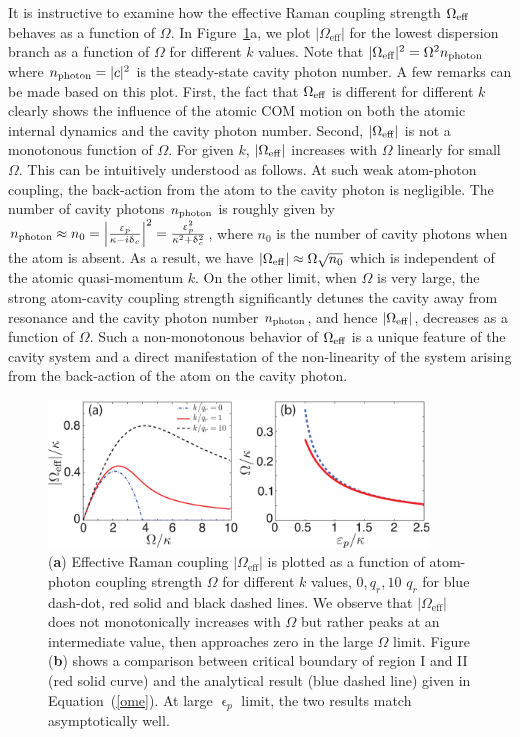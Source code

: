 \documentclass[atoms,article,accept,moreauthors,pdftex,12pt,a4paper]{mdpi}
\begin{document}
It is instructive to examine how the effective Raman coupling strength $\Omega_{\rm eff}$ behaves as a function of $\Omega$. In Figure~\ref{fig2}a, we plot $|\Omega_\text{eff}|$ for the lowest dispersion branch as a function of $\Omega$ for different $k$ values. Note that $|\Omega_{\rm eff}|^2 = \Omega^2 n_{\rm photon}$ where $n_{\rm photon}=|c|^2$ is the steady-state cavity photon number. A few remarks can be made based on this plot. First, the fact that $\Omega_{\rm eff}$ is different for different $k$ clearly shows the influence of the atomic COM motion on both the atomic internal dynamics and the cavity photon number. Second, $|\Omega_{\rm eff}|$ is not a monotonous function of $\Omega$. For given $k$, $|\Omega_{\rm eff}|$ increases with $\Omega$ linearly for small $\Omega$. This can be intuitively understood as follows. At such weak atom-photon coupling, the back-action from the atom to the cavity photon is negligible. The number of cavity photons $n_{\rm photon}$ is roughly given by $n_{\rm photon} \approx n_0=\left|\frac{\upvarepsilon_{p}}{\kappa-i\updelta_{c}}\right|^2= \frac{\upvarepsilon_p^2}{\kappa^2+ \updelta_c^2}$, where $n_0$ is the number of cavity photons when the atom is absent. As a result, we have $|\Omega_{\rm eff}| \approx \Omega \sqrt{n_0}$ which is independent of the atomic quasi-momentum $k$. On the other limit, when $\Omega$ is very large, the strong atom-cavity coupling strength significantly detunes the cavity away from resonance and the cavity photon number $n_{\rm photon}$, and hence $|\Omega_{\rm eff}|$, decreases as a function of $\Omega$. Such a non-monotonous behavior of $\Omega_{\rm eff}$ is a unique feature of the cavity system and a direct manifestation of the non-linearity of the system arising from the back-action of the atom on the cavity photon.


\begin{figure}[H]
\centering
\includegraphics[width=0.9\textwidth]{fig2} \vspace{12pt}
\caption{(\textbf{a}) Effective Raman coupling $|\Omega_\text{eff}|$ is plotted as a function of atom-photon coupling strength $\Omega$ for different $k$ values, $0$,\,$q_r$,\,$10$ $q_r$ for blue dash-dot, red solid and black dashed  lines. We observe that $|\Omega_\text{eff}|$ does not monotonically  increases with $\Omega$ but rather peaks at an intermediate value, then approaches zero in the large $\Omega$ limit. Figure (\textbf{b}) shows a comparison between critical boundary of region I and II (red solid curve) and the analytical result (blue dashed line) given in Equation~(\ref{ome}). At large $\upvarepsilon_p$ limit, the two results match asymptotically well.  }\label{fig2}
\end{figure}
\end{document}
